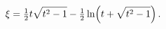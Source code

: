 \[\xi=\tfrac{1}{2}t\sqrt{t^{2}-1}-\tfrac{1}{2}\mathop{\ln\/}\nolimits\!\left(t+%
\sqrt{t^{2}-1}\right).\]